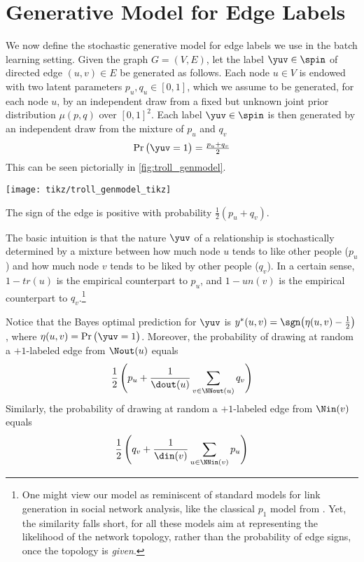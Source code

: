 \section{Generative Model for Edge Labels}\label{s:gen}

We now define the stochastic generative model for edge labels we use in the batch learning setting.
Given the graph $G = (V,E)$, let the label $\yuv \in \spin$ of directed edge $(u,v) \in E$ be
generated as follows. Each node $u \in V$ is endowed with two latent parameters $p_u, q_u \in
[0,1]$, which we assume to be generated, for each node $u$, by an independent draw from a fixed but
unknown joint prior distribution $\mu(p,q)$ over $[0,1]^2$. Each label $\yuv \in \spin$ is then
generated by an independent draw from the mixture of $p_u$ and $q_v$
$$\Pr\big( \yuv = 1 \big) = \tfrac{p_u + q_v}{2}$$
This can be seen pictorially in \autoref{fig:troll_genmodel}.
\begin{marginfigure}
	\centering
	\texttt{[image: tikz/troll\_genmodel\_tikz]}
	\caption{The sign \yuv{} of the edge \euv{} is positive with probability $\frac{1}{2}(p_u+q_v)$.
	\label{fig:troll_genmodel}}
\end{marginfigure}

The basic intuition is that the nature $\yuv$ of a relationship \euv{} is stochastically
determined by a mixture between how much node $u$ tends to like other people ($p_u$) and how much
node $v$ tends to be liked by other people ($q_v$). In a certain sense, $1-tr(u)$ is the empirical
counterpart to $p_u$, and $1-un(v)$ is the empirical counterpart to $q_v$.\footnote{One might view
our model as reminiscent of standard models for link generation in social network analysis, like the
classical $p_1$ model from \cite{hl81}. Yet, the similarity falls short, for all these models aim at
representing the likelihood of the network topology, rather than the probability of edge signs, once
the topology is \emph{given}.} 

Notice that the Bayes optimal prediction for $\yuv$ is $y^*(u,v) = \sgn\big(\eta(u,v) -
\tfrac{1}{2}\big)$, where $\eta(u,v) = \Pr\big( \yuv = 1 \big)$. Moreover, the probability of
drawing at random a $+1$-labeled edge from $\Nout(u)$ equals
\begin{equation}\label{e:pout}
	\frac{1}{2}\,\Biggl(p_u + \frac{1}{\dout(u)} \sum_{v\in \NNout(u)} q_v \Biggl)
\end{equation}
Similarly, the probability of drawing at random a $+1$-labeled edge from $\Nin(v)$ equals
\begin{equation}\label{e:pin}
	\frac{1}{2}\,\Biggl(q_v + \frac{1}{\din(v)} \sum_{u\in \NNin(v)} p_u \Biggl)
\end{equation}
